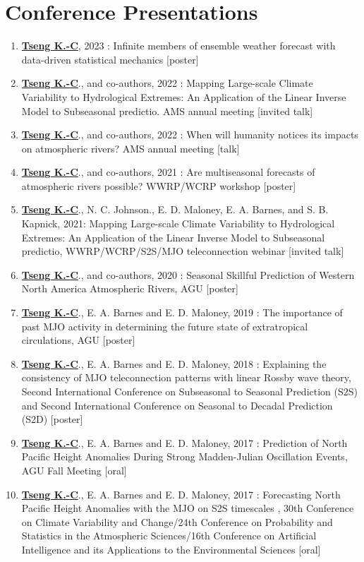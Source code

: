 \documentclass{article}
\begin{document}
\section{\color{airforceblue}Conference Presentations}
\begin{enumerate} 
	\item \normalsize{\bf{\underline{Tseng K.-C}}}, 2023 : Infinite members of ensemble weather forecast with data-driven statistical mechanics [poster]
	\item \normalsize{\bf{\underline{Tseng K.-C}}}., and co-authors, 2022 : Mapping Large-scale Climate Variability to Hydrological Extremes: An Application of the Linear Inverse Model to Subseasonal predictio. AMS annual meeting [invited talk]
	\item \normalsize{\bf{\underline{Tseng K.-C}}}., and co-authors, 2022 : When will humanity notices its impacts on atmospheric rivers? AMS annual meeting [talk]
	\item \normalsize{\bf{\underline{Tseng K.-C}}}., and co-authors, 2021 : Are multiseasonal forecasts of atmospheric rivers possible? WWRP/WCRP workshop [poster]
	\item \normalsize{\bf{\underline{Tseng K.-C}}}., N. C. Johnson., E. D. Maloney, E. A. Barnes, and S. B. Kapnick, 2021: Mapping Large-scale Climate Variability to Hydrological Extremes: An Application of the Linear Inverse Model to Subseasonal predictio, WWRP/WCRP/S2S/MJO teleconnection webinar [invited talk]
	\item \normalsize{\bf{\underline{Tseng K.-C}}}., and co-authors, 2020 : Seasonal Skillful Prediction of Western North America Atmospheric Rivers, AGU [poster]
	\item \normalsize{\bf{\underline{Tseng K.-C}}}., E. A. Barnes and E. D. Maloney, 2019 : The importance of past MJO activity in determining the future state of extratropical circulations, AGU [poster]
	\item \normalsize{\bf{\underline{Tseng K.-C}}}., E. A. Barnes and E. D. Maloney, 2018 : Explaining the consistency of MJO teleconnection patterns with linear Rossby wave theory, Second International Conference on Subseasonal to Seasonal Prediction (S2S) and Second International Conference on Seasonal to Decadal Prediction (S2D) [poster]
	\item \normalsize{\bf{\underline{Tseng K.-C}}}., E. A. Barnes and E. D. Maloney, 2017 : Prediction of North Pacific Height Anomalies During Strong Madden-Julian Oscillation Events, AGU Fall Meeting [oral]
	\item \normalsize{\bf{\underline{Tseng K.-C}}}., E. A. Barnes and E. D. Maloney, 2017 : Forecasting North Pacific Height Anomalies with the MJO on S2S timescales , 30th Conference on Climate Variability and Change/24th Conference on Probability and Statistics in the Atmospheric Sciences/16th Conference on Artificial Intelligence and its Applications to the Environmental Sciences [oral] 

\end{enumerate}
\end{document}

